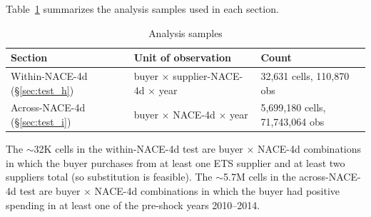 Table~\ref{tab:sample_sizes} summarizes the analysis samples used in each section.

\begin{table}[H]
    \centering
    \caption{Analysis samples}
    \label{tab:sample_sizes}
    \begin{tabular}{lll}
        \toprule
        Section & Unit of observation & Count \\
        \midrule
        Within-NACE-4d (\S\ref{sec:test_h})          & buyer $\times$ supplier-NACE-4d $\times$ year & 32{,}631 cells, 110{,}870 obs \\
        Across-NACE-4d (\S\ref{sec:test_i})          & buyer $\times$ NACE-4d $\times$ year          & 5{,}699{,}180 cells, 71{,}743{,}064 obs \\
        \bottomrule
    \end{tabular}
\end{table}

The $\sim$32K cells in the within-NACE-4d test are buyer $\times$ NACE-4d combinations in which the buyer purchases from at least one ETS supplier and at least two suppliers total (so substitution is feasible). The $\sim$5.7M cells in the across-NACE-4d test are buyer $\times$ NACE-4d combinations in which the buyer had positive spending in at least one of the pre-shock years 2010--2014.
